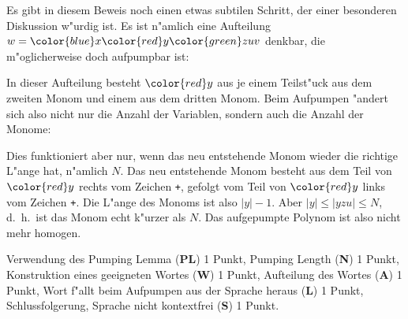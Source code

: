 \begin{diskussion}
Es gibt in diesem Beweis noch einen etwas subtilen Schritt, der einer
besonderen Diskussion w"urdig ist. Es ist n"amlich eine Aufteilung
$w={\color{blue}x}{\color{red}y}{\color{green}z}uv$ denkbar,
die m"oglicherweise doch aufpumpbar ist:
\begin{center}
\end{center}
In dieser Aufteilung besteht $\color{red}y$ aus je einem Teilst"uck
aus dem zweiten Monom und einem aus dem dritten Monom. Beim
Aufpumpen "andert sich also nicht nur die Anzahl der
Variablen, sondern auch die Anzahl der Monome:
\begin{center}
\end{center}
Dies funktioniert
aber nur, wenn das neu entstehende Monom wieder die richtige
L"ange hat, n"amlich $N$. Das neu entstehende Monom besteht
aus dem Teil von $\color{red}y$ rechts vom Zeichen \texttt{+},
gefolgt vom Teil von $\color{red}y$ links vom Zeichen \texttt{+}.
Die L"ange des Monoms ist also $|y|-1$. Aber $|y|\le |yzu|\le N$,
d.~h.~ist das Monom echt k"urzer als $N$. Das aufgepumpte Polynom ist
also nicht mehr homogen.
\end{diskussion}

\begin{bewertung}
Verwendung des Pumping Lemma ({\bf PL}) 1 Punkt,
Pumping Length ({\bf N}) 1 Punkt,
Konstruktion eines geeigneten Wortes ({\bf W}) 1 Punkt,
Aufteilung des Wortes ({\bf A}) 1 Punkt,
Wort f"allt beim Aufpumpen aus der Sprache heraus ({\bf L}) 1 Punkt,
Schlussfolgerung, Sprache nicht kontextfrei ({\bf S}) 1 Punkt.
\end{bewertung}

